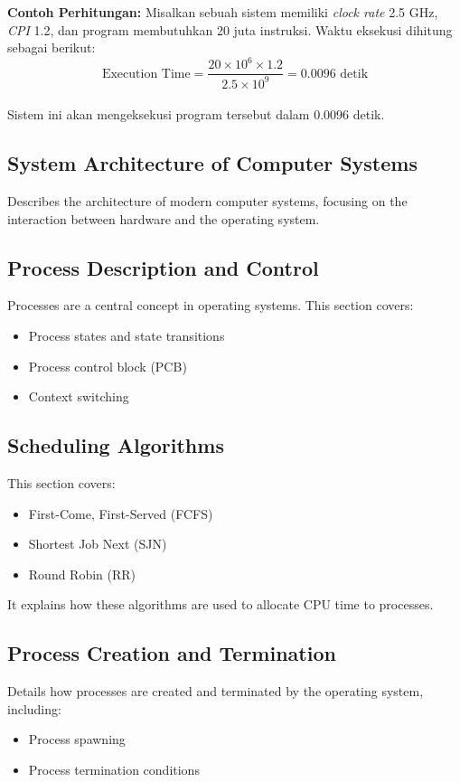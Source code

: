 \documentclass[12pt]{article}
\begin{document}
\textbf{Contoh Perhitungan:} Misalkan sebuah sistem memiliki \textit{clock rate} 2.5 GHz, \textit{CPI} 1.2, dan program membutuhkan 20 juta instruksi. Waktu eksekusi dihitung sebagai berikut:\\

\[
\text{Execution Time} = \frac{20 \times 10^6 \times 1.2}{2.5 \times 10^9} = 0.0096 \text{ detik}
\]\\

Sistem ini akan mengeksekusi program tersebut dalam 0.0096 detik.\\

\subsection{System Architecture of Computer Systems}
Describes the architecture of modern computer systems, focusing on the interaction between hardware and the operating system.

\subsection{Process Description and Control}
Processes are a central concept in operating systems. This section covers:
\begin{itemize}
    \item Process states and state transitions
    \item Process control block (PCB)
    \item Context switching
\end{itemize}

\subsection{Scheduling Algorithms}
This section covers:
\begin{itemize}
    \item First-Come, First-Served (FCFS)
    \item Shortest Job Next (SJN)
    \item Round Robin (RR)
\end{itemize}
It explains how these algorithms are used to allocate CPU time to processes.

\subsection{Process Creation and Termination}
Details how processes are created and terminated by the operating system, including:
\begin{itemize}
    \item Process spawning
    \item Process termination conditions
\end{itemize}
\end{document}
